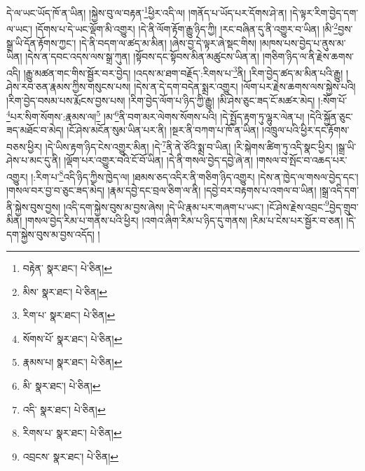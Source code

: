 དེ་ལ་ཡང་ཡོད་ཁོ་ན་ཡིན། །སྐྱེས་བུ་ལ་བརྟན་\footnote{བརྟེན་  སྣར་ཐང་།  པེ་ཅིན། }ཕྱིར་འདི་ལ། །གནོད་པ་ཡོད་པར་དོགས་ཤེ་ན། །དེ་ལྟར་རིག་བྱེད་དག་ལ་ཡང་། །དོགས་པ་དེ་ཡང་ལྡོག་མི་འགྱུར། །དེ་ནི་ལོག་རྟོག་རྒྱུ་ཉིད་ཀྱི། །རང་བཞིན་དུ་ནི་འགྱུར་བ་ཡིན། །མི་\footnote{མིས་  སྣར་ཐང་།  པེ་ཅིན། }བྱས་སྒྲ་ཡི་དོན་རྟོགས་ཀྱང་། །དེ་ནི་བདག་ལ་ཚད་མ་མིན། །ཞེས་བྱ་དེ་ལྟར་ཞེ་སྡང་གིས། །མཁས་པས་བྱེད་པ་ནུས་མ་ཡིན། །དེས་ན་དབང་འདས་ལས་སྒྲ་ཀུན། །སྟོབས་དང་སྟོབས་མིན་མཚུངས་ཡིན་ན། །གཅིག་ཉིད་ལ་ནི་རྗེས་ཆགས་འདི། །རྒྱུ་མཚན་གང་གིས་སྦྱོར་བར་བྱེད། །འདས་མ་ཐག་བརྗོད་:རིགས་པ་\footnote{རིག་པ་  སྣར་ཐང་།  པེ་ཅིན། }ནི། །རིག་བྱེད་ཚད་མ་མིན་པའི་རྒྱུ། །ཤེས་རབ་ཅན་རྣམས་ཀྱིས་གསུངས་པས། །དེས་ན་དེ་དག་བདེན་སྨྲར་འགྱུར། །ལོག་པར་རྗེས་ཆགས་ལས་སྐྱེས་པའི། །རིག་བྱེད་བསམ་པས་རྨོངས་བྱས་པས། །རིག་བྱེད་ལོག་པ་ཉིད་ཀྱི་རྒྱུ། །མི་ཤེས་ཅུང་ཟད་ངོ་མཚར་མེད། །:སོག་པོ་\footnote{སོགས་པོ་  སྣར་ཐང་།  པེ་ཅིན། }པར་སིག་སོགས་:རྣམས་ལ།\footnote{རྣམས་པ།  སྣར་ཐང་།  པེ་ཅིན། } །མ་\footnote{མི་  སྣར་ཐང་།  པེ་ཅིན། }ནི་བག་མར་ལེགས་སོགས་པའི། །དེ་སྤྱོད་རྟག་ཏུ་ལྷུར་ལེན་པ། །དེའི་སྐྱོན་ཅུང་ཟད་མཐོང་བ་མེད། །ངོ་ཤེས་མངོན་སུམ་ཡིན་པར་ནི། །སྔར་ནི་བཀག་པ་ཁོ་ན་ཡིན། །འཁྲུལ་པའི་ཕྱིར་དང་རྟོགས་བཅས་ཕྱིར། །དེ་ཡིས་རྟག་ཉིད་ངེས་འགྱུར་མིན། །དེ་\footnote{འདི་  སྣར་ཐང་།  པེ་ཅིན། }ནི་ནེ་ཙོའི་སྨྲ་བ་ཡིན། །རི་སྐེགས་ཚིག་ཏུ་འདི་སྣང་ཕྱིར། །སྒྲ་ཡི་ཤེས་པ་མང་དུ་ནི། །ལྡོག་པར་འགྱུར་བའི་ངོ་བོ་ཡིན། །དེ་ནི་གསལ་བྱེད་དབྱེ་ཞེ་ན། །གསལ་བ་སྤོང་བ་འཆད་པར་འགྱུར། །:རིག་པ་\footnote{རིགས་པ་  སྣར་ཐང་།  པེ་ཅིན། }འདི་ཉིད་ཀྱིས་ཁྱེད་ལ། །ཐམས་ཅད་འདིར་ནི་གཅིག་ཉིད་འགྱུར། །དེས་ན་ཁྱེད་ལ་གསལ་བྱེད་དང་། །གསལ་བར་བྱ་བ་ཅུང་ཟད་མེད། །རྣམ་དབྱེ་དང་བྲལ་ཅིག་ལ་ནི། །དབྱེ་བར་བརྟགས་པ་འགལ་བ་ཡིན། །སྒྲ་འདི་དག་ནི་སྐྱེས་བུས་བྱས། །འདི་དག་སྐྱེས་བུས་མ་བྱས་ཞེས། །དེ་ཡི་རྣམ་པར་གཞག་པ་ཡང་། །ངོ་ཤེས་རྗེས་འབྲང་\footnote{འབྲངས་  སྣར་ཐང་།  པེ་ཅིན། }བྱེད་གྲུབ་མིན། །གསལ་བྱེད་རིམ་པ་གནས་པའི་ཕྱིར། །འགའ་ཞིག་རིམ་པ་ཉིད་དུ་གནས། །རིམ་པ་ངེས་པར་སྦྱོར་བ་ཅན། །དེ་དག་སྐྱེས་བུས་མ་བྱས་འདོད། །
